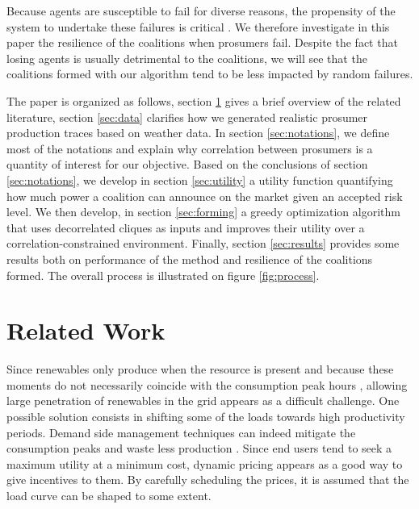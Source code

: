 \documentclass[journal]{IEEEtran}
\begin{document}
Because agents are susceptible to fail for diverse reasons, the propensity of the system to undertake these failures is critical \cite{Pahwa}. We therefore investigate in this paper the resilience of the coalitions when prosumers fail. Despite the fact that losing agents is usually detrimental to the coalitions, we will see that the coalitions formed with our algorithm tend to be less impacted by random failures.

The paper is organized as follows, section \ref{sec:related} gives a brief overview of the related literature, section \ref{sec:data} clarifies how we generated realistic prosumer production traces based on weather data. In section \ref{sec:notations}, we define most of the notations and explain why correlation between prosumers is a quantity of interest for our objective. Based on the conclusions of section \ref{sec:notations}, we develop in section \ref{sec:utility} a utility function quantifying how much power a coalition can announce on the market given an accepted risk level. We then develop, in section \ref{sec:forming} a greedy optimization algorithm that uses decorrelated cliques as inputs and improves their utility over a correlation-constrained environment. Finally, section \ref{sec:results} provides some results both on performance of the method and resilience of the coalitions formed. The overall process is illustrated on figure \ref{fig:process}.


%
%

\section{Related Work}
\label{sec:related}

Since renewables only produce when the resource is present and 
because these moments do not necessarily coincide with the consumption peak hours \cite{Milligan2010}, allowing large penetration of renewables in the grid appears as a difficult challenge. One possible solution consists in shifting some of the loads towards high productivity periods. Demand side management techniques can indeed mitigate the consumption peaks and waste less production \cite{Milligan2010} \cite{Logenthiran2012}. Since end users tend to seek a maximum utility at a minimum cost, dynamic pricing appears as a good way to give incentives to them. By carefully scheduling the prices, it is assumed that the load curve can be shaped to some extent.
\end{document}

